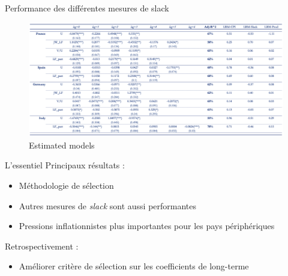 \documentclass[9pt, xcolor={dvipsnames}]{beamer}
\begin{document}
\begin{frame}{Performance des différentes mesures de slack}
  \begin{figure}
    \centering
    \includegraphics[width=1\textwidth]{img/LRM table.png}
    \caption{Estimated models}
  \end{figure}
\end{frame}

\begin{frame}{L'essentiel}
  Principaux résultats :
  \begin{itemize}
    \item Méthodologie de sélection
    \item Autres mesures de \textit{slack} sont aussi performantes
    \item Pressions inflationnistes plus importantes pour les pays périphériques
  \end{itemize}
  \vspace{.2cm}
  Retrospectivement :
  \begin{itemize}
    \item Améliorer critère de sélection sur les coefficients de long-terme 
  \end{itemize}
  \vspace{.2cm}
\end{frame}


\end{document}
